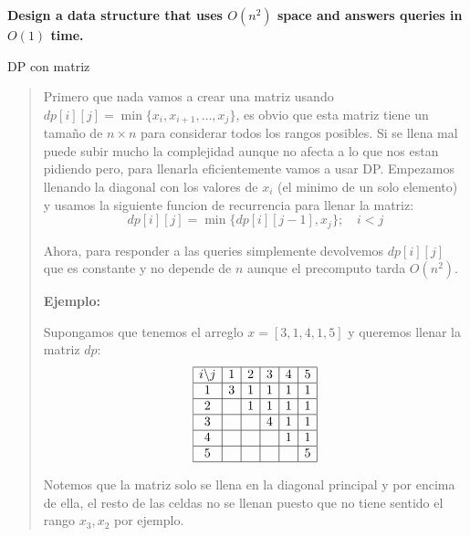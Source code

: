 \textbf{Design a data structure that uses $O(n^2)$ space and answers queries in $O(1)$ time.}\vspace{.2cm}

\textcolor{bibi}{DP con matriz}
\begin{quote}
    Primero que nada vamos a crear una matriz usando $dp[i][j] = \min\{x_i, x_{i+1}, \dots, x_j\}$, es obvio que esta matriz tiene un tamaño de $n \times n$ para considerar todos los rangos posibles. Si se llena mal puede subir mucho la complejidad aunque no afecta a lo que nos estan pidiendo pero, para llenarla eficientemente vamos a usar DP. Empezamos llenando la diagonal con los valores de $x_i$ (el minimo de un solo elemento) y usamos la siguiente funcion de recurrencia para llenar la matriz:
    \begin{equation*}
        dp[i][j] = \min\{dp[i][j-1], x_j\} ; \quad i < j
    \end{equation*}

    Ahora, para responder a las queries simplemente devolvemos $dp[i][j]$ que es constante y no depende de $n$ aunque el precomputo tarda $O(n^2)$. \vspace{.2cm}

    \textbf{Ejemplo: }\vspace{.2cm} 

    Supongamos que tenemos el arreglo $x = [3, 1, 4, 1, 5]$ y queremos llenar la matriz $dp$:
    \[
    \begin{array}{|c|c|c|c|c|c|}
    \hline
    i \backslash j & 1 & 2 & 3 & 4 & 5 \\
    \hline
    1 & 3 & 1 & 1 & 1 & 1 \\
    \hline
    2 &   & 1 & 1 & 1 & 1 \\
    \hline
    3 &   &   & 4 & 1 & 1 \\
    \hline
    4 &   &   &   & 1 & 1 \\
    \hline
    5 &   &   &   &   & 5 \\
    \hline
    \end{array}
    \] \vspace{.2cm}

    Notemos que la matriz solo se llena en la diagonal principal y por encima de ella, el resto de las celdas no se llenan puesto que no tiene sentido el rango $x_3, x_2$ por ejemplo. \vspace{.2cm}
\end{quote}